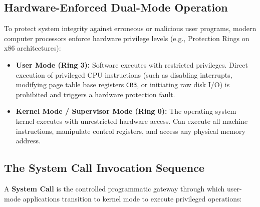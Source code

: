 \subsection{Hardware-Enforced Dual-Mode Operation}
To protect system integrity against erroneous or malicious user programs, modern computer processors enforce hardware privilege levels (e.g., Protection Rings on x86 architectures):
\begin{itemize}
    \item \textbf{User Mode (Ring 3):} Software executes with restricted privileges. Direct execution of privileged CPU instructions (such as disabling interrupts, modifying page table base registers \texttt{CR3}, or initiating raw disk I/O) is prohibited and triggers a hardware protection fault.
    \item \textbf{Kernel Mode / Supervisor Mode (Ring 0):} The operating system kernel executes with unrestricted hardware access. Can execute all machine instructions, manipulate control registers, and access any physical memory address.
\end{itemize}

\subsection{The System Call Invocation Sequence}
A \textbf{System Call} is the controlled programmatic gateway through which user-mode applications transition to kernel mode to execute privileged operations:

